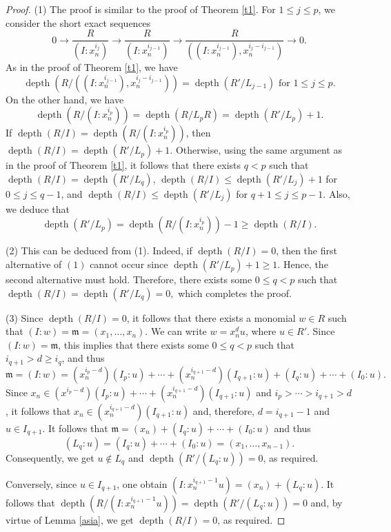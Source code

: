 \documentclass[11pt]{amsart}
\def\depth{\operatorname{depth}}
\begin{document}
\begin{proof}
(1) The proof is similar to the proof of Theorem \ref{t1}. For $1\leq j\leq p$, we consider the short exact sequences
\begin{equation}\label{seq2}
0 \to \frac{R}{(I:x_n^{i_j})} \to \frac{R}{(I:x_n^{i_{j-1}})} \to \frac{R}{((I:x_n^{i_{j-1}}),x_n^{i_j-i_{j-1}})} \to 0.
\end{equation}
As in the proof of Theorem \ref{t1}, we have 
$$\depth(R/((I:x_n^{i_{j-1}}),x_n^{i_j-i_{j-1}})) = \depth(R'/L_{j-1}) \text{ for }1\leq j\leq p.$$
On the other hand, we have 
$$\depth(R/(I:x_n^{i_{p}}))=\depth(R/L_pR)=\depth(R'/L_p)+1.$$
If $\depth(R/I)=\depth(R/(I:x_n^{i_{p}}))$, then $\depth(R/I)=\depth(R'/L_p)+1$. Otherwise, using the same argument as in the
proof of Theorem \ref{t1}, it follows that there exists $q<p$ such that $\depth(R/I)=\depth(R'/L_q)$, 
$\depth(R/I)\leq \depth(R'/L_j)+1$  for $0\leq j\leq q-1$, and $\depth(R/I)\leq \depth(R'/L_j)$  for $q+1\leq j\leq p-1$.
Also, we deduce that  $$\depth(R'/L_p)=\depth(R/(I:x_n^{i_{p}}))-1 \geq \depth(R/I).$$

(2) This can be deduced from (1). Indeed, if $\depth(R/I)=0$, then the first alternative of $(1)$ cannot occur since
 $\depth(R'/L_p)+1\geq 1.$ Hence, the second alternative must hold. Therefore, there exists some $0\leq q<p$ such that
  $\depth(R/I)=\depth(R'/L_q)=0,$ which completes the proof.

(3) Since $\depth(R/I)=0$, it follows that there exists a monomial $w\in R$ such that $(I:w)=\mathfrak m=(x_1,\ldots,x_n)$.
We can write $w=x_n^du$, where $u\in R'$. Since $(I:w)=\mathfrak m$, this implies that  there exists some $0\leq q<p$ such that
$i_{q+1}>d\geq i_q$, and thus 
$$\mathfrak m = (I:w) = (x_n^{i_p-d})(I_p:u) + \cdots + (x_n^{i_{q+1}-d})(I_{q+1}:u) + (I_q:u) + \cdots + (I_0:u).$$
Since $x_n\in (x^{i_p-d})(I_p:u) + \cdots + (x_n^{i_{q+1}-d})(I_{q+1}:u)$ and $i_p>\cdots>i_{q+1}>d$, it follows
that $x_n \in (x_n^{i_{q+1}-d})(I_{q+1}:u)$ and, therefore, $d=i_{q+1}-1$ and $u\in I_{q+1}$. 
It follows that $\mathfrak m = (x_n)+(I_q:u) + \cdots + (I_0:u)$ and thus
$$(L_q:u)=(I_q:u) + \cdots + (I_0:u)=(x_1,\ldots,x_{n-1}).$$ 
Consequently, we get $u\notin L_q$ and $\depth(R'/(L_q:u))=0$, as required. 

Conversely, since $u\in I_{q+1}$, one obtain $(I:x_n^{i_{q+1}-1}u) = (x_n) + (L_q:u)$.
It follows that $\depth(R/(I:x_n^{i_{q+1}-1}u))=\depth(R'/(L_q:u))=0$ and, by virtue of Lemma \ref{asia}, we get $\depth(R/I)=0$, as required.
\end{proof}
\end{document}
